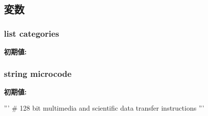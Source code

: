 \subsection{変数}
\hypertarget{namespaceinsts_1_1simd128_1_1integer_1_1data__transfer_a273cf0f1630af14c1582f05e53354a55}{
\subsubsection[{categories}]{\setlength{\rightskip}{0pt plus 5cm}list {\bf categories}}}
\label{namespaceinsts_1_1simd128_1_1integer_1_1data__transfer_a273cf0f1630af14c1582f05e53354a55}
{\bfseries 初期値:}
\begin{DoxyCode}
\end{DoxyCode}
\hypertarget{namespaceinsts_1_1simd128_1_1integer_1_1data__transfer_a770f11a173e99389a8802f0107ed8f52}{
\subsubsection[{microcode}]{\setlength{\rightskip}{0pt plus 5cm}string {\bf microcode}}}
\label{namespaceinsts_1_1simd128_1_1integer_1_1data__transfer_a770f11a173e99389a8802f0107ed8f52}
{\bfseries 初期値:}
\begin{DoxyCode}
'''
# 128 bit multimedia and scientific data transfer instructions
'''
\end{DoxyCode}

